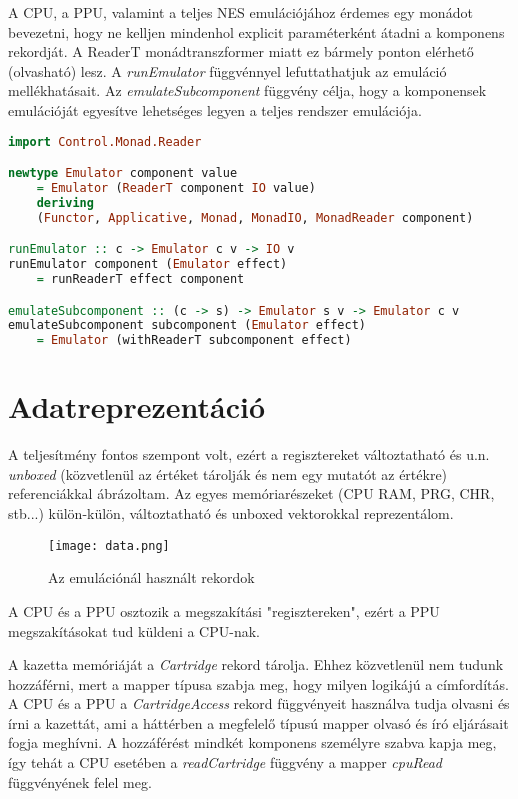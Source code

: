 A CPU, a PPU, valamint a teljes NES emulációjához érdemes egy monádot bevezetni, hogy ne kelljen mindenhol explicit paraméterként átadni a komponens rekordját. A ReaderT monádtranszformer miatt ez bármely ponton elérhető (olvasható) lesz. A \emph{runEmulator} függvénnyel lefuttathatjuk az emuláció mellékhatásait. Az \emph{emulateSubcomponent} függvény célja, hogy a komponensek emulációját egyesítve lehetséges legyen a teljes rendszer emulációja.
\vspace{0.2cm}
\begin{lstlisting}[language=Haskell, basicstyle=\scriptsize]
import Control.Monad.Reader

newtype Emulator component value 
	= Emulator (ReaderT component IO value) 
	deriving 
	(Functor, Applicative, Monad, MonadIO, MonadReader component)

runEmulator :: c -> Emulator c v -> IO v
runEmulator component (Emulator effect) 
	= runReaderT effect component

emulateSubcomponent :: (c -> s) -> Emulator s v -> Emulator c v
emulateSubcomponent subcomponent (Emulator effect) 
	= Emulator (withReaderT subcomponent effect)
\end{lstlisting}

\section{Adatreprezentáció}

A teljesítmény fontos szempont volt, ezért a regisztereket változtatható és u.n. \emph{unboxed} (közvetlenül az értéket tárolják és nem egy mutatót az értékre) referenciákkal ábrázoltam. Az egyes memóriarészeket (CPU RAM, PRG, CHR, stb...) külön-külön, változtatható és unboxed vektorokkal reprezentálom.

\begin{figure}[H]
	\centering
	\texttt{[image: data.png]}
	\caption{Az emulációnál használt rekordok}
\end{figure}

A CPU és a PPU osztozik a megszakítási "regisztereken", ezért a PPU megszakításokat tud küldeni a CPU-nak.

A kazetta memóriáját a \emph{Cartridge} rekord tárolja. Ehhez közvetlenül nem tudunk hozzáférni, mert a mapper típusa szabja meg, hogy milyen logikájú a címfordítás. A CPU és a PPU a \emph{CartridgeAccess} rekord függvényeit használva tudja olvasni és írni a kazettát, ami a háttérben a megfelelő típusú mapper olvasó és író eljárásait fogja meghívni. A hozzáférést mindkét komponens személyre szabva kapja meg, így tehát a CPU esetében a \emph{readCartridge} függvény a mapper \emph{cpuRead} függvényének felel meg.

